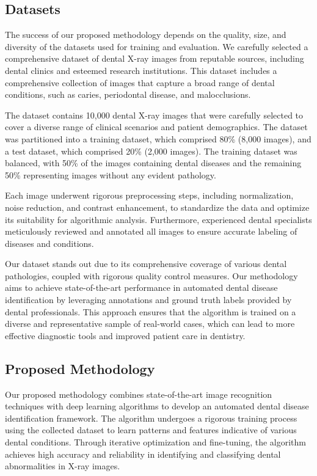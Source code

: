 \documentclass[journal,twoside,web]{ieeecolor}
\begin{document}
\subsection{Datasets}

The success of our proposed methodology depends on the quality, size, and diversity of the datasets used for training and evaluation. We carefully selected a comprehensive dataset of dental X-ray images from reputable sources, including dental clinics and esteemed research institutions. This dataset includes a comprehensive collection of images that capture a broad range of dental conditions, such as caries, periodontal disease, and malocclusions.

The dataset contains 10,000 dental X-ray images that were carefully selected to cover a diverse range of clinical scenarios and patient demographics. The dataset was partitioned into a training dataset, which comprised 80\% (8,000 images), and a test dataset, which comprised 20\% (2,000 images). The training dataset was balanced, with 50\% of the images containing dental diseases and the remaining 50\% representing images without any evident pathology.

Each image underwent rigorous preprocessing steps, including normalization, noise reduction, and contrast enhancement, to standardize the data and optimize its suitability for algorithmic analysis. Furthermore, experienced dental specialists meticulously reviewed and annotated all images to ensure accurate labeling of diseases and conditions.

Our dataset stands out due to its comprehensive coverage of various dental pathologies, coupled with rigorous quality control measures. Our methodology aims to achieve state-of-the-art performance in automated dental disease identification by leveraging annotations and ground truth labels provided by dental professionals. This approach ensures that the algorithm is trained on a diverse and representative sample of real-world cases, which can lead to more effective diagnostic tools and improved patient care in dentistry.



\subsection{Proposed Methodology}

Our proposed methodology combines state-of-the-art image recognition techniques with deep learning algorithms to develop an automated dental disease identification framework. The algorithm undergoes a rigorous training process using the collected dataset to learn patterns and features indicative of various dental conditions. Through iterative optimization and fine-tuning, the algorithm achieves high accuracy and reliability in identifying and classifying dental abnormalities in X-ray images.
\end{document}
